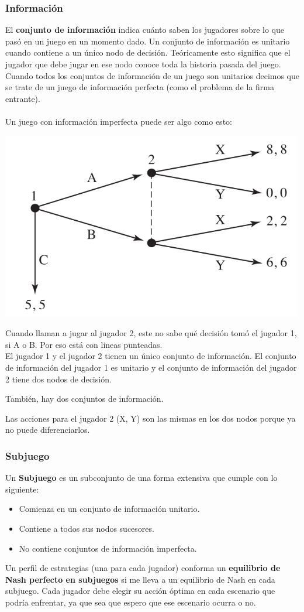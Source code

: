 \documentclass{article}
\begin{document}
            \subsubsection*{Información}
                El \textbf{conjunto de información} indica cuánto saben los jugadores sobre lo que pasó en un juego en un momento dado. Un conjunto de información es unitario cuando contiene a un único nodo de decisión. Teóricamente esto significa que el jugador que debe jugar en ese nodo conoce toda la historia pasada del juego. Cuando todos los conjuntos de información de un juego son unitarios decimos que se trate de un juego de información perfecta (como el problema de la firma entrante). \\
                \\
                Un juego con información imperfecta puede ser algo como esto: \\
                \begin{center}
                    \includegraphics[width=0.5 \linewidth]{figs/informacion.png}
                \end{center}
                Cuando llaman a jugar al jugador 2, este no sabe qué decisión tomó el jugador 1, si A o B. Por eso está con lineas punteadas. \\
                El jugador 1 y el jugador 2 tienen un único conjunto de información. El conjunto de información del jugador 1 es unitario y el conjunto de información del jugador 2 tiene dos nodos de decisión.

                También, hay dos conjuntos de información.

                Las acciones para el jugador 2 (X, Y) son las mismas en los dos nodos porque ya no puede diferenciarlos.
            \subsubsection*{Subjuego}
                Un \textbf{Subjuego} es un subconjunto de una forma extensiva que cumple con lo siguiente:
                \begin{itemize}
                    \item Comienza en un conjunto de información unitario.
                    \item Contiene a todos sus nodos sucesores.
                    \item No contiene conjuntos de información imperfecta.
                \end{itemize}
                Un perfil de estrategias (una para cada jugador) conforma un \textbf{equilibrio de Nash perfecto en subjuegos} si me lleva a un equilibrio de Nash en cada subjuego. Cada jugador debe elegir su acción óptima en cada escenario que podría enfrentar, ya que sea que espero que ese escenario ocurra o no.
\end{document}
